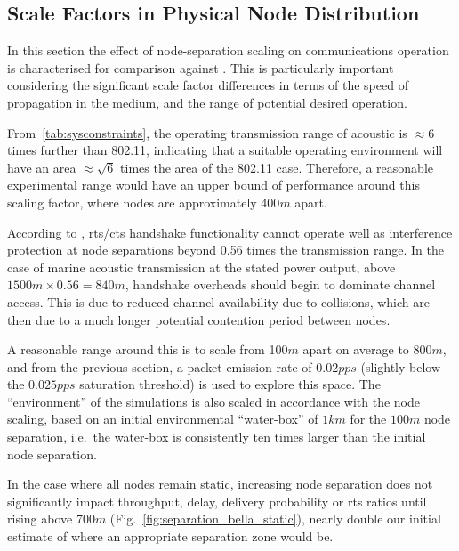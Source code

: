 \clearpage

\subsection{Scale Factors in Physical Node Distribution}

In this section the effect of node-separation scaling on communications operation is characterised for comparison against \cite{Guo11}. 
This is particularly important considering the significant scale factor differences in terms of the speed of propagation in the medium, and the range of potential desired operation.

From~\autoref{tab:sysconstraints}, the operating transmission range of acoustic is $\approx 6$ times further than 802.11, indicating that a suitable operating environment will have an area $\approx \sqrt{6}$ times the area of the 802.11 case. Therefore, a reasonable experimental range would have an upper bound of performance around this scaling factor, where nodes are approximately 400$m$ apart. 

According to \citet{Xu2002}, \gls{rts}/\gls{cts} handshake functionality cannot operate well as interference protection at node separations beyond 0.56 times the transmission range\cite{Xu2002}.
In the case of marine acoustic transmission at the stated power output, above $1500m \times 0.56 = 840m$, handshake overheads should begin to dominate channel access.
This is due to reduced channel availability due to collisions, which are then due to a much longer potential contention period between nodes. 

A reasonable range around this is to scale from 100$m$ apart on average to $800m$, and from the previous section, a packet emission rate of $0.02pps$ (slightly below the $0.025pps$ saturation threshold) is used to explore this space.
The ``environment'' of the simulations is also scaled in accordance with the node scaling, based on an initial environmental ``water-box'' of $1km$ for the $100m$ node separation, i.e.\ the water-box is consistently ten times larger than the initial node separation.

In the case where all nodes remain static, increasing node separation does not significantly impact throughput, delay, delivery probability or \gls{rts} ratios until rising above 700$m$ (Fig.~\ref{fig:separation_bella_static}), nearly double our initial estimate of where an appropriate separation zone would be.

